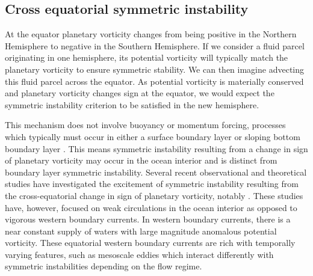 \subsection{Cross equatorial symmetric instability}
\label{sec:CrossEqSI}
At the equator planetary vorticity changes from being positive in the Northern Hemisphere to negative in the Southern Hemisphere. If we consider a fluid parcel originating in one hemisphere, its potential vorticity will typically match the planetary vorticity to ensure symmetric stability. We can then imagine advecting this fluid parcel across the equator. As potential vorticity is materially conserved and planetary vorticity changes sign at the equator, we would expect the symmetric instability criterion to be satisfied in the new hemisphere.

This mechanism does not involve buoyancy or momentum forcing, processes which typically must occur in either a surface boundary layer or sloping bottom boundary layer \citep{Haine1998, Wenegrat2020}. This means symmetric instability resulting from a change in sign of planetary vorticity may occur in the ocean interior and is distinct from boundary layer symmetric instability. Several recent observational and theoretical studies have investigated the excitement of symmetric instability resulting from the cross-equatorial change in sign of planetary vorticity, notably \citet{Forryan2021, Jakoboski2022, Zhou2022}. These studies have, however, focused on weak circulations in the ocean interior as opposed to vigorous western boundary currents. In western boundary currents, there is a near constant supply of waters with large magnitude anomalous potential vorticity. These equatorial western boundary currents are rich with temporally varying features, such as mesoscale eddies \citep{Edwards1998I, Dengler2004} which interact differently with symmetric instabilities depending on the flow regime.

